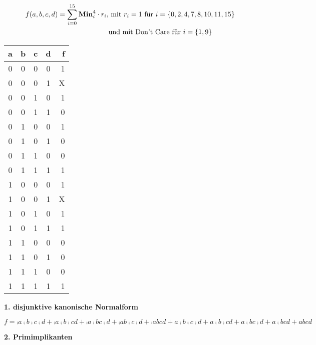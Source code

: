 \documentclass{CInf_practice}
\begin{document}
\cinftitle


\begin{align*}
f(a,b,c,d) = \sum\limits^{15}_{i=0} \text{\bf Min}^{4}_i \cdot r_i, &\text{ mit } r_i=1 \text{ für } i = \left\{0,2,4,7,8,10,11,15\right\}\\
& \text{und mit Don't Care für } i=\left\{1,9\right\}
\end{align*}

\begin{center}
\begin{tabular}{CCCC|R}
a & b & c & d & f \\  & 0 & 0 & 0 & 1 \\
0 & 0 & 0 & 1 & X \\
0 & 0 & 1 & 0 & 1 \\
0 & 0 & 1 & 1 & 0 \\
0 & 1 & 0 & 0 & 1 \\
0 & 1 & 0 & 1 & 0 \\
0 & 1 & 1 & 0 & 0 \\
0 & 1 & 1 & 1 & 1 \\
1 & 0 & 0 & 0 & 1 \\
1 & 0 & 0 & 1 & X \\
1 & 0 & 1 & 0 & 1 \\
1 & 0 & 1 & 1 & 1 \\
1 & 1 & 0 & 0 & 0 \\
1 & 1 & 0 & 1 & 0 \\
1 & 1 & 1 & 0 & 0 \\
1 & 1 & 1 & 1 & 1 \\
\end{tabular}
\end{center}

\textbf{1. disjunktive kanonische Normalform}

$f = \comp a \comp b \comp c \comp d
   + \comp a \comp b \comp c       d
   + \comp a \comp b       c \comp d 
   + \comp a       b \comp c \comp d
   + \comp a       b       c       d 
   +       a \comp b \comp c \comp d
   +       a \comp b \comp c       d   
   +       a \comp b       c \comp d 
   +       a \comp b       c       d 
   +       a       b       c       d$

\textbf{2. Primimplikanten}
\end{document}
